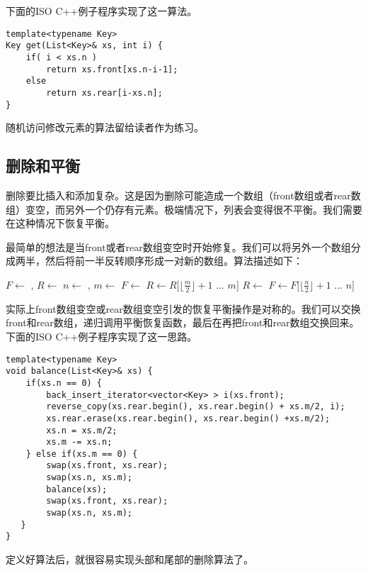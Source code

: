 \documentclass[UTF8]{article}
\begin{document}
下面的ISO C++例子程序实现了这一算法。

\begin{lstlisting}
template<typename Key>
Key get(List<Key>& xs, int i) {
    if( i < xs.n )
        return xs.front[xs.n-i-1];
    else
        return xs.rear[i-xs.n];
}
\end{lstlisting}

随机访问修改元素的算法留给读者作为练习。

\subsection{删除和平衡}
删除要比插入和添加复杂。这是因为删除可能造成一个数组（front数组或者rear数组）变空，而另外一个仍存有元素。极端情况下，列表会变得很不平衡。我们需要在这种情况下恢复平衡。

最简单的想法是当front或者rear数组变空时开始修复。我们可以将另外一个数组分成两半，然后将前一半反转顺序形成一对新的数组。算法描述如下：

\begin{algorithmic}
  \State $F \gets$ , $R \gets$ 
  \State $n \gets$ , $m \gets$ 
    \State $F \gets$ 
    \State $R \gets R[\lfloor \frac{m}{2} \rfloor + 1$ ... $m]$
    \State $R \gets$ 
    \State $F \gets F[\lfloor \frac{n}{2} \rfloor + 1$ ... $n]$
  \EndIf
\EndFunction
\end{algorithmic}

实际上front数组变空或rear数组变空引发的恢复平衡操作是对称的。我们可以交换front和rear数组，递归调用平衡恢复函数，最后在再把front和rear数组交换回来。下面的ISO C++例子程序实现了这一思路。

\begin{lstlisting}
template<typename Key>
void balance(List<Key>& xs) {
    if(xs.n == 0) {
        back_insert_iterator<vector<Key> > i(xs.front);
        reverse_copy(xs.rear.begin(), xs.rear.begin() + xs.m/2, i);
        xs.rear.erase(xs.rear.begin(), xs.rear.begin() +xs.m/2);
        xs.n = xs.m/2;
        xs.m -= xs.n;
    } else if(xs.m == 0) {
        swap(xs.front, xs.rear);
        swap(xs.n, xs.m);
        balance(xs);
        swap(xs.front, xs.rear);
        swap(xs.n, xs.m);
   }
}
\end{lstlisting}

定义好算法后，就很容易实现头部和尾部的删除算法了。
\end{document}

